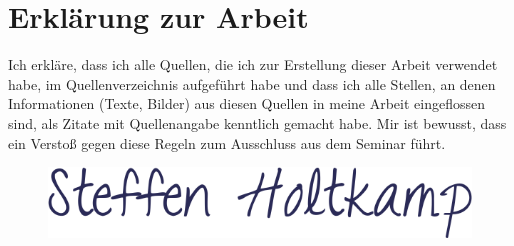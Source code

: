 \newpage
\section{Erklärung zur Arbeit}
Ich erkläre, dass ich alle Quellen, die ich zur Erstellung dieser Arbeit verwendet
habe, im Quellenverzeichnis aufgeführt habe und dass ich alle Stellen, an denen
Informationen (Texte, Bilder) aus diesen Quellen in meine Arbeit eingeflossen
sind, als Zitate mit Quellenangabe kenntlich gemacht habe. Mir ist bewusst, dass
ein Verstoß gegen diese Regeln zum Ausschluss aus dem Seminar führt.


\begin{figure}[!h]
\includegraphics[scale=0.3]{Bilder/Unterschrift.png}
\end{figure}



